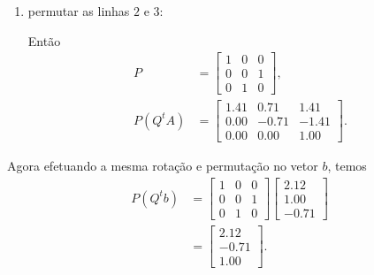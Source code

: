 \documentclass[a4paper,12pt, leqno, answers]{exam}
\begin{document}
\begin{questions}
\begin{solution}
\begin{enumerate}
            \item permutar as linhas $2$ e $3$:

                Ent\~{a}o
                \begin{align*}
                    P &= \begin{bmatrix}
                        1 & 0 & 0 \\
                        0 & 0 & 1 \\
                        0 & 1 & 0
                    \end{bmatrix}, \\
                    P \left( Q^t A \right) &= \begin{bmatrix}
                        1.41 & 0.71 & 1.41 \\
                        0.00 & -0.71 & -1.41 \\
                        0.00 & 0.00 & 1.00
                    \end{bmatrix}.
                \end{align*}
        \end{enumerate}

        Agora efetuando a mesma rota\c{c}\~{a}o e permuta\c{c}\~{a}o no vetor $b$, temos
        \begin{align*}
            P \left( Q^t b \right) &= \begin{bmatrix}
                1 & 0 & 0 \\
                0 & 0 & 1 \\
                0 & 1 & 0
            \end{bmatrix} \begin{bmatrix}
                2.12 \\
                1.00 \\
                -0.71
            \end{bmatrix} \\
            &= \begin{bmatrix}
                2.12 \\
                -0.71 \\
                1.00
            \end{bmatrix}.
        \end{align*}


\end{solution}
\end{questions}
\end{document}
